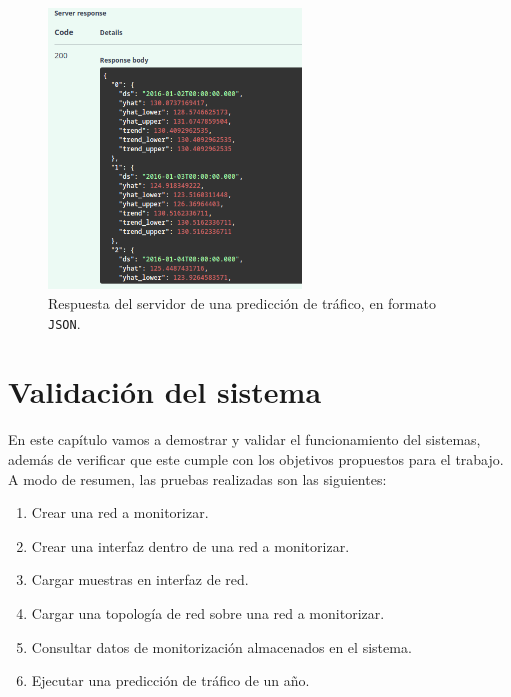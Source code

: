 \documentclass[a4paper, oneside, 12pt]{book}
\begin{document}
\begin{enumerate}
\begin{itemize}
			\pagebreak
			
			\begin{figure}[h!]
				\begin{center}
					\includegraphics[width=0.6\textwidth]{img/output_forecast_json.png}
					\caption{Respuesta del servidor de una predicción de tráfico, en formato \texttt{JSON}.}
					\label{img: output forecast json}
				\end{center}
			\end{figure}
		\end{itemize}
	\end{enumerate}
	
	\pagebreak
	
	\chapter{Validación del sistema}
	
	\noindent En este capítulo vamos a demostrar y validar el funcionamiento del sistemas, además de verificar que este cumple con los objetivos propuestos para el trabajo. A modo de resumen, las pruebas realizadas son las siguientes:
	
	\begin{enumerate}
		\item Crear una red a monitorizar.
		\item Crear una interfaz dentro de una red a monitorizar.
		\item Cargar muestras en interfaz de red.
		\item Cargar una topología de red sobre una red a monitorizar.
		\item Consultar datos de monitorización almacenados en el sistema.
		\item Ejecutar una predicción de tráfico de un año.
	\end{enumerate}
\end{document}
